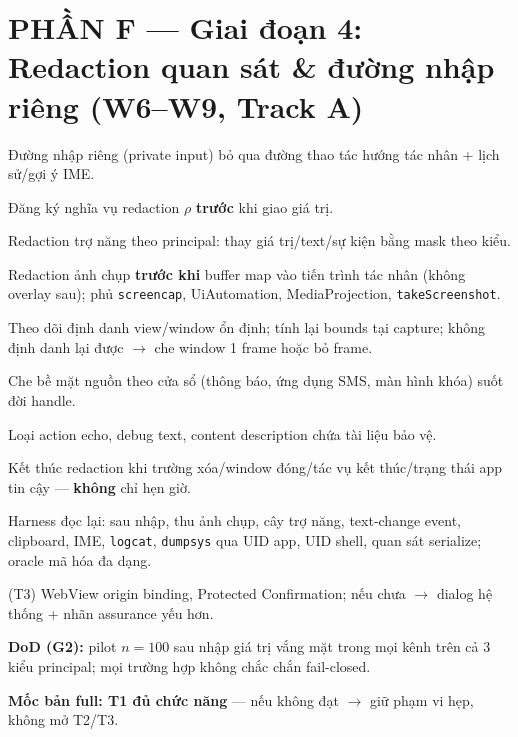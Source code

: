 \documentclass[11pt,a4paper]{article}
\newcommand{\todo}{\textcolor{shgray}{$\square$}}
\newcommand{\code}[1]{\texttt{\small #1}}
\begin{document}
\section*{PHẦN F --- Giai đoạn 4: Redaction quan sát \& đường nhập riêng (W6--W9, Track A)}
\begin{chk}
\item[\todo] Đường nhập riêng (private input) bỏ qua đường thao tác hướng tác nhân + lịch sử/gợi ý IME.
\item[\todo] Đăng ký nghĩa vụ redaction $\rho$ \textbf{trước} khi giao giá trị.
\item[\todo] Redaction trợ năng theo principal: thay giá trị/text/sự kiện bằng mask theo kiểu.
\item[\todo] Redaction ảnh chụp \textbf{trước khi} buffer map vào tiến trình tác nhân (không overlay sau); phủ \code{screencap}, UiAutomation, MediaProjection, \code{takeScreenshot}.
\item[\todo] Theo dõi định danh view/window ổn định; tính lại bounds tại capture; không định danh lại được $\to$ che window 1 frame hoặc bỏ frame.
\item[\todo] Che bề mặt nguồn theo cửa sổ (thông báo, ứng dụng SMS, màn hình khóa) suốt đời handle.
\item[\todo] Loại action echo, debug text, content description chứa tài liệu bảo vệ.
\item[\todo] Kết thúc redaction khi trường xóa/window đóng/tác vụ kết thúc/trạng thái app tin cậy --- \textbf{không} chỉ hẹn giờ.
\item[\todo] Harness đọc lại: sau nhập, thu ảnh chụp, cây trợ năng, text-change event, clipboard, IME, \code{logcat}, \code{dumpsys} qua UID app, UID shell, quan sát serialize; oracle mã hóa đa dạng.
\item[\todo] (T3) WebView origin binding, Protected Confirmation; nếu chưa $\to$ dialog hệ thống + nhãn assurance yếu hơn.
\item[\todo] \textbf{DoD (G2):} pilot $n=100$ sau nhập giá trị vắng mặt trong mọi kênh trên cả 3 kiểu principal; mọi trường hợp không chắc chắn fail-closed.
\item[\todo] \textbf{Mốc bản full: T1 đủ chức năng} --- nếu không đạt $\to$ giữ phạm vi hẹp, không mở T2/T3.
\end{chk}
\end{document}
